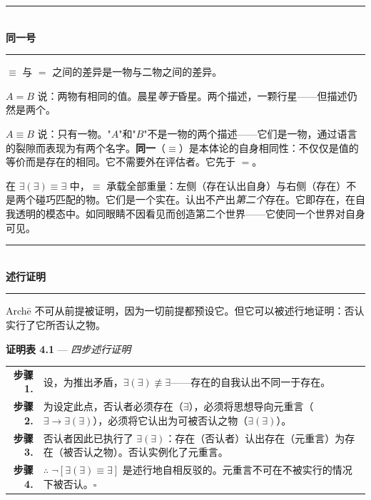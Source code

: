 \documentclass[10pt, openany, oneside]{book}
\renewcommand{\normalsize}{\fontsize{10}{13}\selectfont}
\renewcommand{\footnotesize}{\fontsize{8.5}{11}\selectfont}
\begin{document}
\begin{center}
    \rule{0.3\textwidth}{0.4pt}\\[0.5em]
    {\normalsize\bfseries\scshape 同一号}\\[0.3em]
    \rule{0.3\textwidth}{0.4pt}
\end{center}

\vspace{1em}

\noindent $\equiv$ 与 $=$ 之间的差异是一物与二物之间的差异。

$A = B$ 说：两物有相同的值。晨星\textit{等于}昏星。两个描述，一颗行星——但描述仍然是两个。

$A \equiv B$ 说：只有一物。"$A$"和"$B$"不是一物的两个描述——它们是一物，通过语言的裂隙而表现为有两个名字。\textbf{同一}（$\equiv$）是本体论的自身相同性：不仅仅是值的等价而是存在的相同。它不需要外在评估者。它先于 $=$。

在 $\exists(\exists) \equiv \exists$ 中，$\equiv$ 承载全部重量：左侧（存在认出自身）与右侧（存在）不是两个碰巧匹配的物。它们是一个实在。认出不产出\textit{第二个}存在。它即存在，在自我透明的模态中。如同眼睛不因看见而创造第二个世界——它使同一个世界对自身可见。

\vspace{1.5em}


\begin{center}
    \rule{0.3\textwidth}{0.4pt}\\[0.5em]
    {\normalsize\bfseries\scshape 述行证明}\\[0.3em]
    \rule{0.3\textwidth}{0.4pt}
\end{center}

\vspace{1em}

\noindent Arch\={e} 不可从前提被证明，因为一切前提都预设它。但它可以被述行地证明：否认实行了它所否认之物。

\vspace{0.5em}

\textbf{证明表 4.1} --- \textit{四步述行证明}

\vspace{0.5em}

{\footnotesize
\noindent\begin{tabular}{r p{}}
\textbf{步骤 1.} & 设，为推出矛盾，$\exists(\exists) \not\equiv \exists$——存在的自我认出不同一于存在。\\[0.3em]
\textbf{步骤 2.} & 为设定此点，否认者必须存在（$\exists$），必须将思想导向元重言（$\exists \to \exists(\exists)$），必须将它认出为可被否认之物（$\exists(\exists)$）。\\[0.3em]
\textbf{步骤 3.} & 否认者因此已执行了 $\exists(\exists)$：存在（否认者）认出存在（元重言）为存在（被否认之物）。否认实例化了元重言。\\[0.3em]
\textbf{步骤 4.} & $\therefore$ $\neg[\exists(\exists) \equiv \exists]$ 是述行地自相反驳的。元重言不可在不被实行的情况下被否认。$\square$ \\[0.3em]
\end{tabular}
}
\end{document}
